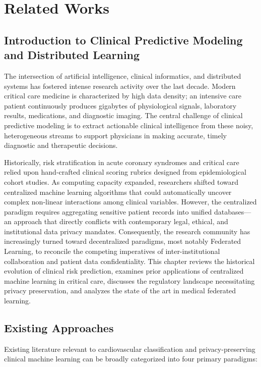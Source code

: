 \chapter{Related Works}
\label{ch:related_works}

\section{Introduction to Clinical Predictive Modeling and Distributed Learning}
\label{sec:rel_intro}

The intersection of artificial intelligence, clinical informatics, and distributed systems has fostered intense research activity over the last decade. Modern critical care medicine is characterized by high data density; an intensive care patient continuously produces gigabytes of physiological signals, laboratory results, medications, and diagnostic imaging. The central challenge of clinical predictive modeling is to extract actionable clinical intelligence from these noisy, heterogeneous streams to support physicians in making accurate, timely diagnostic and therapeutic decisions.

Historically, risk stratification in acute coronary syndromes and critical care relied upon hand-crafted clinical scoring rubrics designed from epidemiological cohort studies. As computing capacity expanded, researchers shifted toward centralized machine learning algorithms that could automatically uncover complex non-linear interactions among clinical variables. However, the centralized paradigm requires aggregating sensitive patient records into unified databases—an approach that directly conflicts with contemporary legal, ethical, and institutional data privacy mandates. Consequently, the research community has increasingly turned toward decentralized paradigms, most notably Federated Learning, to reconcile the competing imperatives of inter-institutional collaboration and patient data confidentiality. This chapter reviews the historical evolution of clinical risk prediction, examines prior applications of centralized machine learning in critical care, discusses the regulatory landscape necessitating privacy preservation, and analyzes the state of the art in medical federated learning.

\section{Existing Approaches}
\label{sec:existing_approaches}

Existing literature relevant to cardiovascular classification and privacy-preserving clinical machine learning can be broadly categorized into four primary paradigms:

